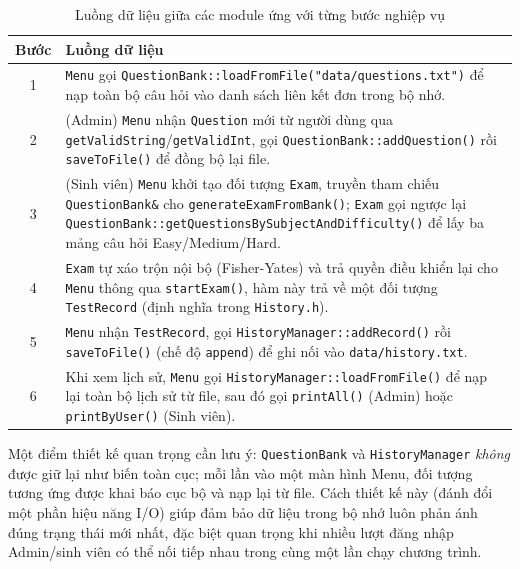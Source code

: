 \documentclass[11pt]{report}
\begin{document}
\begin{table}[H]
    \centering
    \begin{tabularx}{\textwidth}{|c|>{\raggedright\arraybackslash}X|} \hline
        \textbf{Bước} & \textbf{Luồng dữ liệu} \\ \hline
        1 & \texttt{Menu} gọi \texttt{QuestionBank::loadFromFile("data/questions.txt")} để nạp toàn bộ câu hỏi vào danh sách liên kết đơn trong bộ nhớ. \\ \hline
        2 & (Admin) \texttt{Menu} nhận \texttt{Question} mới từ người dùng qua \texttt{getValidString}/\texttt{getValidInt}, gọi \texttt{QuestionBank::addQuestion()} rồi \texttt{saveToFile()} để đồng bộ lại file. \\ \hline
        3 & (Sinh viên) \texttt{Menu} khởi tạo đối tượng \texttt{Exam}, truyền tham chiếu \texttt{QuestionBank\&} cho \texttt{generateExamFromBank()}; \texttt{Exam} gọi ngược lại \texttt{QuestionBank::getQuestionsBySubjectAndDifficulty()} để lấy ba mảng câu hỏi Easy/Medium/Hard. \\ \hline
        4 & \texttt{Exam} tự xáo trộn nội bộ (Fisher-Yates) và trả quyền điều khiển lại cho \texttt{Menu} thông qua \texttt{startExam()}, hàm này trả về một đối tượng \texttt{TestRecord} (định nghĩa trong \texttt{History.h}). \\ \hline
        5 & \texttt{Menu} nhận \texttt{TestRecord}, gọi \texttt{HistoryManager::addRecord()} rồi \texttt{saveToFile()} (chế độ \texttt{append}) để ghi nối vào \texttt{data/history.txt}. \\ \hline
        6 & Khi xem lịch sử, \texttt{Menu} gọi \texttt{HistoryManager::loadFromFile()} để nạp lại toàn bộ lịch sử từ file, sau đó gọi \texttt{printAll()} (Admin) hoặc \texttt{printByUser()} (Sinh viên). \\ \hline
    \end{tabularx}
    \caption{Luồng dữ liệu giữa các module ứng với từng bước nghiệp vụ}
    \label{tab:dataflow}
\end{table}

Một điểm thiết kế quan trọng cần lưu ý: \texttt{QuestionBank} và \texttt{HistoryManager} \textit{không} được giữ lại như biến toàn cục; mỗi lần vào một màn hình Menu, đối tượng tương ứng được khai báo cục bộ và nạp lại từ file. Cách thiết kế này (đánh đổi một phần hiệu năng I/O) giúp đảm bảo dữ liệu trong bộ nhớ luôn phản ánh đúng trạng thái mới nhất, đặc biệt quan trọng khi nhiều lượt đăng nhập Admin/sinh viên có thể nối tiếp nhau trong cùng một lần chạy chương trình.
\end{document}
